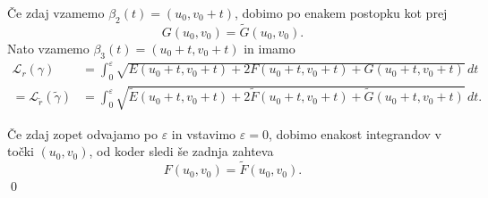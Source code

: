 Če zdaj vzamemo $\beta_2(t) = (u_0, v_0 + t)$, dobimo po enakem postopku kot prej 
\begin{equation*} G(u_0, v_0) = \tilde{G}(u_0, v_0). \end{equation*}
Nato vzamemo $\beta_3(t) = (u_0 + t, v_0 + t)$ in imamo
\begin{align*}
  \mathcal{L}_r(\gamma) &= \int_{0}^{\varepsilon} \sqrt{E(u_0 + t, v_0 + t) + 2F(u_0 + t, v_0 + t) + G(u_0 + t, v_0 + t)}   \, dt  \\
  = \mathcal{L}_{\tilde{r}}(\tilde{\gamma}) &= \int_{0}^{\varepsilon} \sqrt{\tilde{E}(u_0 + t, v_0 + t) + 2\tilde{F}(u_0 + t, v_0 + t) + \tilde{G}(u_0 + t, v_0 + t)}   \, dt. 
\end{align*}

Če zdaj zopet odvajamo po $\varepsilon$ in vstavimo $\varepsilon = 0$, dobimo enakost integrandov v točki $(u_0, v_0)$, od koder sledi še zadnja zahteva
\begin{equation*} F(u_0, v_0) = \tilde{F}(u_0, v_0). \end{equation*}
\qed

